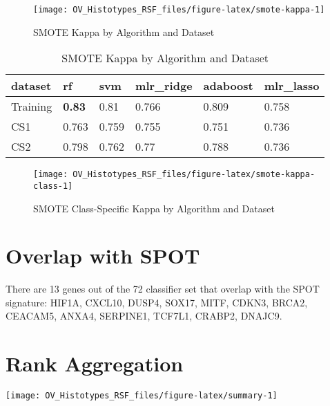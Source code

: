 \documentclass[
]{report}
\begin{document}
\begin{figure}[H]

{\centering \texttt{[image: OV\_Histotypes\_RSF\_files/figure-latex/smote-kappa-1]} 

}

\caption{SMOTE Kappa by Algorithm and Dataset}\label{fig:smote-kappa}
\end{figure}

\begin{table}

\caption{\label{tab:smote-kappa-table}SMOTE Kappa by Algorithm and Dataset}
\centering
\begin{tabular}[t]{l|l|l|l|l|l}
\hline
dataset & rf & svm & mlr\_ridge & adaboost & mlr\_lasso\\
\hline
Training & \textbf{0.83} & 0.81 & 0.766 & 0.809 & 0.758\\
\hline
CS1 & 0.763 & 0.759 & 0.755 & 0.751 & 0.736\\
\hline
CS2 & 0.798 & 0.762 & 0.77 & 0.788 & 0.736\\
\hline
\end{tabular}
\end{table}

\begin{figure}[H]

{\centering \texttt{[image: OV\_Histotypes\_RSF\_files/figure-latex/smote-kappa-class-1]} 

}

\caption{SMOTE Class-Specific Kappa by Algorithm and Dataset}\label{fig:smote-kappa-class}
\end{figure}

\hypertarget{overlap-with-spot}{%
\section{Overlap with SPOT}\label{overlap-with-spot}}

There are 13 genes out of the 72 classifier set that overlap with the SPOT signature: HIF1A, CXCL10, DUSP4, SOX17, MITF, CDKN3, BRCA2, CEACAM5, ANXA4, SERPINE1, TCF7L1, CRABP2, DNAJC9.

\hypertarget{rank-aggregation}{%
\section{Rank Aggregation}\label{rank-aggregation}}

\begin{center}\texttt{[image: OV\_Histotypes\_RSF\_files/figure-latex/summary-1]} \end{center}
\end{document}
